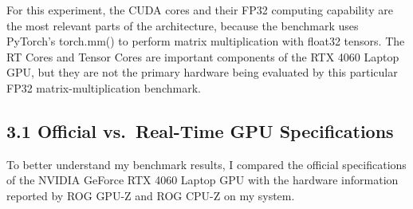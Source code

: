 \documentclass[11pt]{article}
\begin{document}
For this experiment, the CUDA cores and their FP32 computing capability
are the most relevant parts of the architecture, because the benchmark
uses PyTorch's torch.mm() to perform matrix multiplication with float32
tensors. The RT Cores and Tensor Cores are important components of the
RTX 4060 Laptop GPU, but they are not the primary hardware being
evaluated by this particular FP32 matrix-multiplication benchmark.

\subsection{3.1 Official vs.~Real-Time GPU
Specifications}\label{official-vs.-real-time-gpu-specifications}

To better understand my benchmark results, I compared the official
specifications of the NVIDIA GeForce RTX 4060 Laptop GPU with the
hardware information reported by ROG GPU-Z and ROG CPU-Z on my system.
\end{document}
